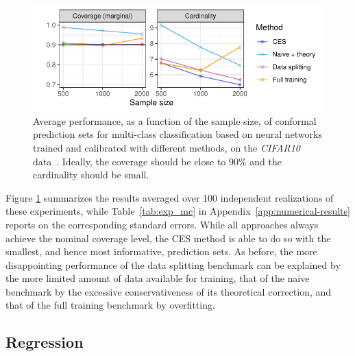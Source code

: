 \begin{figure}[!htb]
    \centering
    \includegraphics[width=\linewidth]{figures/exp_mc.pdf}\vspace{-0.5cm}
    \caption{Average performance, as a function of the sample size, of conformal prediction sets for multi-class classification based on neural networks trained and calibrated with different methods, on the {\em CIFAR10} data~\cite{cifar10}. Ideally, the coverage should be close to 90\% and the cardinality should be small.}
    \label{fig:exp_mc}
\end{figure}

Figure \ref{fig:exp_mc} summarizes the results averaged over 100 independent realizations of these experiments, while Table~\ref{tab:exp_mc} in Appendix~\ref{app:numerical-results} reports on the corresponding standard errors.
While all approaches always achieve the nominal coverage level, the CES method is able to do so with the smallest, and hence most informative, prediction sets.
As before, the more disappointing performance of the data splitting benchmark can be explained by the more limited amount of data available for training, that of the naive benchmark by the excessive conservativeness of its theoretical correction, and that of the full training benchmark by overfitting.


\subsection{Regression}


